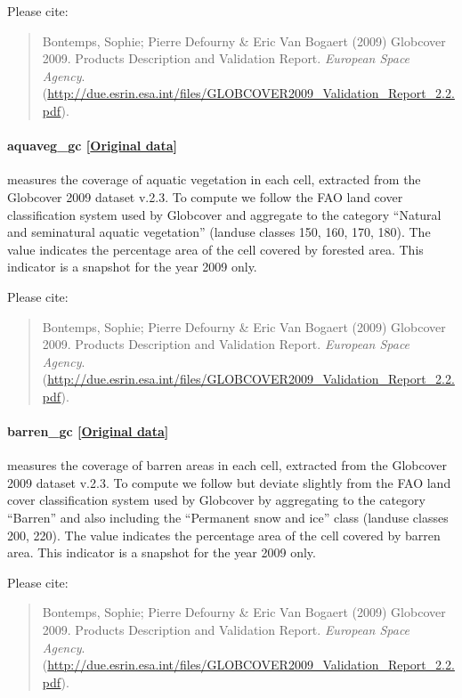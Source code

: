 \documentclass[]{book}
\begin{document}
Please cite:

\begin{quote}
Bontemps, Sophie; Pierre Defourny \& Eric Van Bogaert (2009) Globcover
2009. Products Description and Validation Report. \emph{European Space
Agency}.
(\url{http://due.esrin.esa.int/files/GLOBCOVER2009_Validation_Report_2.2.pdf}).
\end{quote}

\paragraph{aquaveg\_gc
{[}\href{http://due.esrin.esa.int/page_globcover.php}{Original
data}{]}}\label{aquaveg-gc}

measures the coverage of aquatic vegetation in each cell, extracted from
the Globcover 2009 dataset v.2.3. To compute  we
follow the FAO land cover classification system used by Globcover and
aggregate to the category ``Natural and seminatural aquatic vegetation''
(landuse classes 150, 160, 170, 180). The value indicates the percentage
area of the cell covered by forested area. This indicator is a snapshot
for the year 2009 only.

Please cite:

\begin{quote}
Bontemps, Sophie; Pierre Defourny \& Eric Van Bogaert (2009) Globcover
2009. Products Description and Validation Report. \emph{European Space
Agency}.
(\url{http://due.esrin.esa.int/files/GLOBCOVER2009_Validation_Report_2.2.pdf}).
\end{quote}

\paragraph{barren\_gc
{[}\href{http://due.esrin.esa.int/page_globcover.php}{Original
data}{]}}\label{barren-gc}

measures the coverage of barren areas in each cell, extracted from the
Globcover 2009 dataset v.2.3. To compute  we follow
but deviate slightly from the FAO land cover classification system used
by Globcover by aggregating to the category ``Barren'' and also
including the ``Permanent snow and ice'' class (landuse classes 200,
220). The value indicates the percentage area of the cell covered by
barren area. This indicator is a snapshot for the year 2009 only.

Please cite:

\begin{quote}
Bontemps, Sophie; Pierre Defourny \& Eric Van Bogaert (2009) Globcover
2009. Products Description and Validation Report. \emph{European Space
Agency}.
(\url{http://due.esrin.esa.int/files/GLOBCOVER2009_Validation_Report_2.2.pdf}).
\end{quote}
\end{document}
